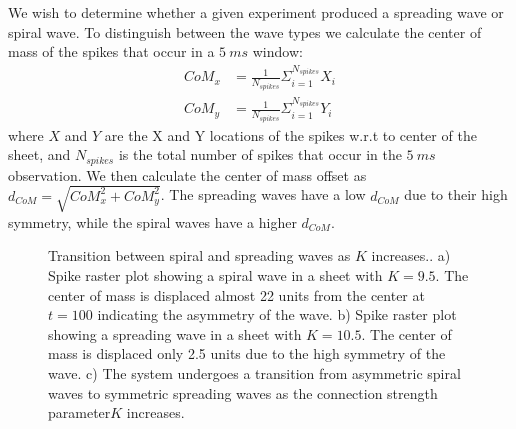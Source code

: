 We wish to determine whether a given experiment produced a spreading wave or spiral wave.
To distinguish between the wave types we calculate the center of mass of the spikes that occur in a $5~ms$ window:
\begin{align}
 CoM_x &= \frac{1}{N_{spikes}}\Sigma_{i=1}^{N_{spikes}} X_i\\
 CoM_y &= \frac{1}{N_{spikes}}\Sigma_{i=1}^{N_{spikes}} Y_i
\end{align}
where $X$ and $Y$ are the X and Y locations of the spikes w.r.t to center of the sheet, and $N_{spikes}$ is the total number of spikes that occur in the $5~ms$ observation.
We then calculate the center of mass offset as $d_{CoM}=\sqrt{CoM_x^2 + CoM_y^2}$.
The spreading waves have a low $d_{CoM}$ due to their high symmetry, while the spiral waves have a higher $d_{CoM}$.
\begin{figure}[!htb]
 \caption{Transition between spiral and spreading waves as $K$ increases..
          a) Spike raster plot showing a spiral wave in a sheet with $K=9.5$. The center of mass is displaced almost 22 units from the center at $t=100$ indicating the asymmetry of the wave.
          b) Spike raster plot showing a spreading wave in a sheet with $K=10.5$. The center of mass is displaced only 2.5 units due to the high symmetry of the wave.
          c) The system undergoes a transition from asymmetric spiral waves to symmetric spreading waves as the connection strength parameter$K$ increases.
          } 

\end{figure}
